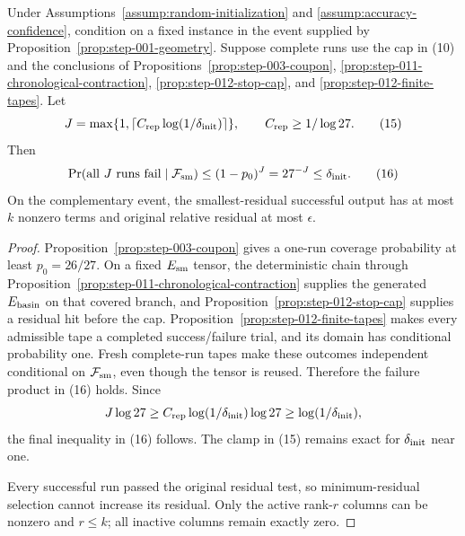 \begin{proposition}\label{prop:step-012-restart}
Under Assumptions~\ref{assump:random-initialization} and
\ref{assump:accuracy-confidence}, condition on a fixed instance in the event
supplied by Proposition~\ref{prop:step-001-geometry}. Suppose complete runs
use the cap in (10) and the conclusions of
Propositions~\ref{prop:step-003-coupon},
\ref{prop:step-011-chronological-contraction},
\ref{prop:step-012-stop-cap}, and
\ref{prop:step-012-finite-tapes}. Let
\[
 J=\max\{1,\lceil C_{\rm rep}\log(1/\delta_{\rm init})\rceil\},
 \qquad C_{\rm rep}\ge1/\log27.
\tag{15}
\]
Then
\[
 \Pr(\text{all \(J\) runs fail}\mid{\cal F}_{\rm sm})
 \le(1-p_0)^J=27^{-J}\le\delta_{\rm init}.
\tag{16}
\]
On the complementary event, the smallest-residual successful output has at
most \(k\) nonzero terms and original relative residual at most \(\epsilon\).

\begin{proof}
Proposition~\ref{prop:step-003-coupon} gives a one-run coverage probability
at least \(p_0=26/27\). On a fixed \(E_{\rm sm}\) tensor, the deterministic chain through
Proposition~\ref{prop:step-011-chronological-contraction} supplies the
generated \(E_{\rm basin}\) on that covered branch, and
Proposition~\ref{prop:step-012-stop-cap} supplies a residual hit before the
cap. Proposition~\ref{prop:step-012-finite-tapes} makes every admissible tape
a completed success/failure trial, and its domain has conditional probability
one. Fresh complete-run tapes make these outcomes independent conditional on
\({\cal F}_{\rm sm}\), even though the tensor is reused. Therefore the
failure product in (16) holds. Since
\[
 J\log27\ge C_{\rm rep}\log(1/\delta_{\rm init})\log27
 \ge\log(1/\delta_{\rm init}),
\]
the final inequality in (16) follows. The clamp in (15) remains exact for
\(\delta_{\rm init}\) near one.

Every successful run passed the original residual test, so minimum-residual
selection cannot increase its residual. Only the active rank-\(r\) columns
can be nonzero and \(r\le k\); all inactive columns remain exactly zero.


\end{proof}
\end{proposition}
